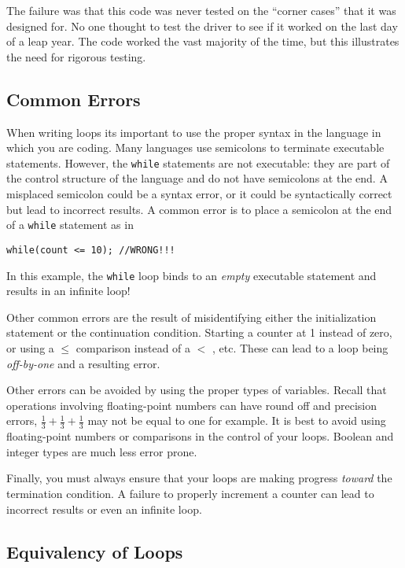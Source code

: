 The failure was that this code was never tested on the 
``corner cases'' that it was designed for.  No one thought to test the driver to see
if it worked on the last day of a leap year.  The code worked the vast majority of the time, 
but this illustrates the need for rigorous testing.

\subsection{Common Errors}

When writing loops its important to use the proper syntax in the
language in which you are coding.  Many languages use semicolons
to terminate executable statements.  However, the \texttt{while}
statements are not executable: they are part of the control structure
of the language and do not have semicolons at the end.  A misplaced
semicolon could be a syntax error, or it could be syntactically correct
but lead to incorrect results.  A common error is to place a semicolon
at the end of a \texttt{while} statement as in 

\texttt{while(count <= 10); //WRONG!!!}

In this example, the \texttt{while} loop binds to an \emph{empty}
executable statement and results in an infinite loop!

Other common errors are the result of misidentifying either the
initialization statement or the continuation condition.  Starting a
counter at 1 instead of zero, or using a $\leq$ comparison instead
of a $<$ , etc.  These can lead to a loop being \emph{off-by-one} 
and a resulting error.

Other errors can be avoided by using the proper types of variables.
Recall that operations involving floating-point numbers can have 
round off and precision errors, $\frac{1}{3} + \frac{1}{3} + \frac{1}{3}$
may not be equal to one for example.  It is best to avoid using 
floating-point numbers or comparisons in the control of your loops.
Boolean and integer types are much less error prone.  

Finally, you must always ensure that your loops are making progress
\emph{toward} the termination condition.  A failure to properly 
increment a counter can lead to incorrect results or even an infinite
loop.

\subsection{Equivalency of Loops}

